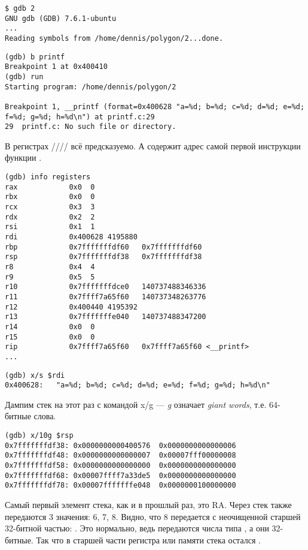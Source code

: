 \begin{lstlisting}
$ gdb 2
GNU gdb (GDB) 7.6.1-ubuntu
...
Reading symbols from /home/dennis/polygon/2...done.
\end{lstlisting}

\begin{lstlisting}[caption=ставим точку останова на \printf{,} запускаем]
(gdb) b printf
Breakpoint 1 at 0x400410
(gdb) run
Starting program: /home/dennis/polygon/2 

Breakpoint 1, __printf (format=0x400628 "a=%d; b=%d; c=%d; d=%d; e=%d; f=%d; g=%d; h=%d\n") at printf.c:29
29	printf.c: No such file or directory.
\end{lstlisting}

В регистрах \RSI/\RDX/\RCX// 
всё предсказуемо.
А \RIP содержит адрес самой первой инструкции функции \printf{}.

\begin{lstlisting}
(gdb) info registers
rax            0x0	0
rbx            0x0	0
rcx            0x3	3
rdx            0x2	2
rsi            0x1	1
rdi            0x400628	4195880
rbp            0x7fffffffdf60	0x7fffffffdf60
rsp            0x7fffffffdf38	0x7fffffffdf38
r8             0x4	4
r9             0x5	5
r10            0x7fffffffdce0	140737488346336
r11            0x7ffff7a65f60	140737348263776
r12            0x400440	4195392
r13            0x7fffffffe040	140737488347200
r14            0x0	0
r15            0x0	0
rip            0x7ffff7a65f60	0x7ffff7a65f60 <__printf>
...
\end{lstlisting}

\begin{lstlisting}[caption=смотрим на строку формата]
(gdb) x/s $rdi
0x400628:	"a=%d; b=%d; c=%d; d=%d; e=%d; f=%d; g=%d; h=%d\n"
\end{lstlisting}

Дампим стек на этот раз с командой x/g --- \emph{g} означает \emph{giant words}, т.е. 64-битные слова.

\begin{lstlisting}
(gdb) x/10g $rsp
0x7fffffffdf38:	0x0000000000400576	0x0000000000000006
0x7fffffffdf48:	0x0000000000000007	0x00007fff00000008
0x7fffffffdf58:	0x0000000000000000	0x0000000000000000
0x7fffffffdf68:	0x00007ffff7a33de5	0x0000000000000000
0x7fffffffdf78:	0x00007fffffffe048	0x0000000100000000
\end{lstlisting}

Самый первый элемент стека, как и в прошлый раз, это \ac{RA}.
Через стек также передаются 3 значения: 6, 7, 8.
Видно, что 8 передается с неочищенной старшей 32-битной частью: .
Это нормально, ведь передаются числа типа \Tint, а они 32-битные.
Так что в старшей части регистра или памяти стека остался .

